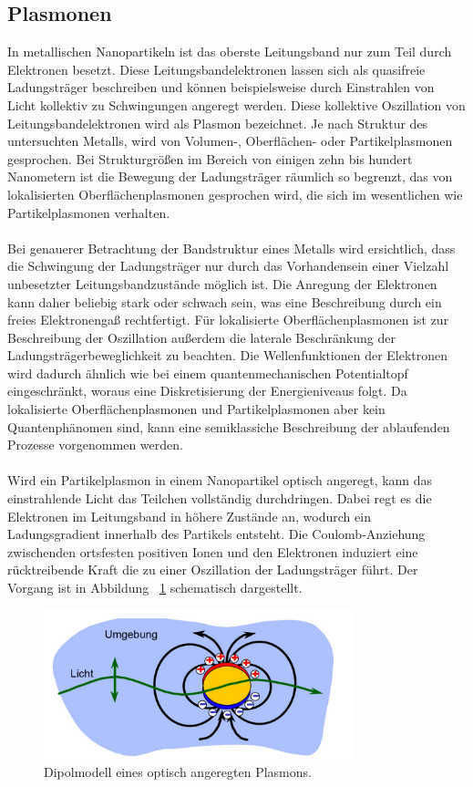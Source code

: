 \subsection{Plasmonen}
In metallischen Nanopartikeln ist das oberste Leitungsband nur zum Teil durch Elektronen besetzt. Diese Leitungsbandelektronen lassen sich als quasifreie Ladungsträger beschreiben und können beispielsweise durch Einstrahlen von Licht kollektiv zu Schwingungen angeregt werden. Diese kollektive Oszillation von Leitungsbandelektronen wird als Plasmon bezeichnet. Je nach Struktur des untersuchten Metalls, wird von Volumen-, Oberflächen- oder Partikelplasmonen gesprochen. Bei Strukturgrößen im Bereich von einigen zehn bis hundert Nanometern ist die Bewegung der Ladungsträger räumlich so begrenzt, das von lokalisierten Oberflächenplasmonen gesprochen wird, die sich im wesentlichen wie Partikelplasmonen verhalten.\\
\\
Bei genauerer Betrachtung der Bandstruktur eines Metalls wird ersichtlich, dass die Schwingung der Ladungsträger nur durch das Vorhandensein einer Vielzahl unbesetzter Leitungsbandzustände möglich ist. Die Anregung der Elektronen kann daher beliebig stark oder schwach sein, was eine Beschreibung durch ein freies Elektronengaß rechtfertigt. Für lokalisierte Oberflächenplasmonen ist zur Beschreibung der Oszillation außerdem die laterale Beschränkung der Ladungsträgerbeweglichkeit zu beachten. Die Wellenfunktionen der Elektronen wird dadurch ähnlich wie bei einem quantenmechanischen Potentialtopf eingeschränkt, woraus eine Diskretisierung der Energieniveaus folgt. Da lokalisierte Oberflächenplasmonen und Partikelplasmonen aber kein Quantenphänomen sind, kann eine semiklassiche Beschreibung der ablaufenden Prozesse vorgenommen werden. \cite{anleitung}\cite{bayreuth}\\
\\
Wird ein Partikelplasmon in einem Nanopartikel optisch angeregt, kann das einstrahlende Licht das Teilchen vollständig durchdringen. Dabei regt es die Elektronen im Leitungsband in höhere Zustände an, wodurch ein Ladungsgradient innerhalb des Partikels entsteht. Die Coulomb-Anziehung zwischenden ortsfesten positiven Ionen und den Elektronen induziert eine rücktreibende Kraft die zu einer Oszillation der Ladungsträger führt. Der Vorgang ist in Abbildung ~\ref{fig:dipol} schematisch dargestellt.
\begin{figure}[H]
  \centering
  \includegraphics[width=0.8\textwidth]{plots/dipolplamson.jpg}
  \caption{Dipolmodell eines optisch angeregten Plasmons. \cite{anleitung}}
  \label{fig:dipol}
\end{figure}

